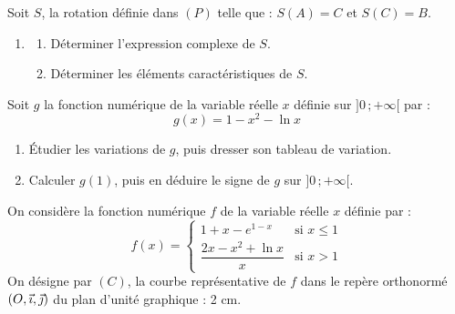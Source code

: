 \documentclass[11pt]{article}
\begin{document}
Soit $S$, la rotation définie dans $(P)$ telle que : $S(A) = C$ et $S(C) = B$.

\begin{enumerate}[start=3]
  \item \begin{enumerate}[label=\alph*.]
    \item Déterminer l'expression complexe de $S$.
    \item Déterminer les éléments caractéristiques de $S$.
  \end{enumerate}
\end{enumerate}


Soit $g$ la fonction numérique de la variable réelle $x$ définie sur $]0\,;+\infty[$ par :
\[ g(x) = 1 - x^2 - \ln x \]

\begin{enumerate}
  \item Étudier les variations de $g$, puis dresser son tableau de variation.
  \item Calculer $g(1)$, puis en déduire le signe de $g$ sur $]0\,;+\infty[$.
\end{enumerate}

On considère la fonction numérique $f$ de la variable réelle $x$ définie par :
\[ f(x) = \begin{cases} 1 + x - e^{1-x} & \text{si } x \le 1 \\[1ex] \dfrac{2x - x^2 + \ln x}{x} & \text{si } x > 1 \end{cases} \]
On désigne par $(C)$, la courbe représentative de $f$ dans le repère orthonormé $(O,\vec{\imath},\vec{\jmath})$ du plan d'unité graphique : 2 cm.
\end{document}
